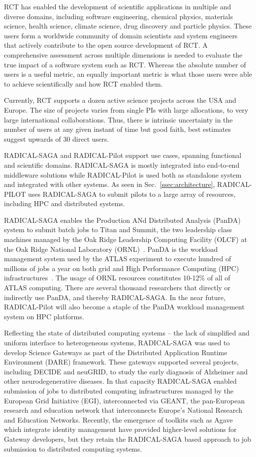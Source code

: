 \documentclass[preprint,12pt, a4paper]{elsarticle}
\begin{document}
RCT has enabled the development of scientific applications in multiple and
diverse domains, including software engineering, chemical physics, materials
science, health science, climate science, drug discovery and particle
physics. These users form a worldwide community of domain scientists and
system engineers that actively contribute to the open source development of
RCT. A comprehensive assessment across multiple dimensions is needed to
evaluate the true impact of a software system such as RCT. Whereas the
absolute number of users is a useful metric, an equally important metric is
what those users were able to achieve scientifically and how RCT enabled
them.

Currently, RCT supports a dozen active science projects across the USA and
Europe. The size of projects varies from single PIs with large allocations,
to very large international collaborations. Thus, there is intrinsic
uncertainty in the number of users at any given instant of time but good
faith, best estimates suggest upwards of 30 direct users.

RADICAL-SAGA and RADICAL-Pilot support use cases, spanning functional and
scientific domains. RADICAL-SAGA is mostly integrated into end-to-end
middleware solutions while RADICAL-Pilot is used both as standalone system
and integrated with other systems. As seen in Sec.~\ref{ssec:architecture},
RADICAL-PILOT uses RADICAL-SAGA to submit pilots to a large array of
resources, including HPC and distributed systems.

RADICAL-SAGA enables the Production ANd Distributed Analysis (PanDA) system
to submit batch jobs to Titan and Summit, the two leadership class machines
managed by the Oak Ridge Leadership Computing Facility (OLCF) at the Oak
Ridge National Laboratory (ORNL)~\cite{web-olcf-resources}. PanDA is the
workload management system used by the ATLAS experiment to execute hundred of
millions of jobs a year on both grid and High Performance Computing (HPC)
infrastructures~\cite{maeno2008panda}. The usage of ORNL resources
constitutes 10-12\% of all of ATLAS computing. There are several thousand
researchers that directly or indirectly use PanDA, and thereby RADICAL-SAGA.
In the near future, RADICAL-Pilot will also become a staple of the PanDA
workload management system on HPC platforms.

Reflecting the state of distributed computing systems -- the lack of
simplified and uniform interface to heterogeneous systems, RADICAL-SAGA was
used to develop Science Gateways as part of the Distributed Application
Runtime Environment (DARE) framework. These gateways supported several
projects, including DECIDE and neuGRID, to study the early diagnosis of
Alzheimer and other neurodegenerative diseases. In that capacity RADICAL-SAGA
enabled submission of jobs to distributed computing infrastructures managed
by the European Grid Initiative (EGI), interconnected via GEANT, the
pan-European research and education network that interconnects Europe’s
National Research and Education Networks. Recently, the emergence of toolkits
such as Agave which integrate identity management have provided higher-level
solutions for Gateway developers, but they retain the RADICAL-SAGA based
approach to job submission to distributed computing systems.
\end{document}
